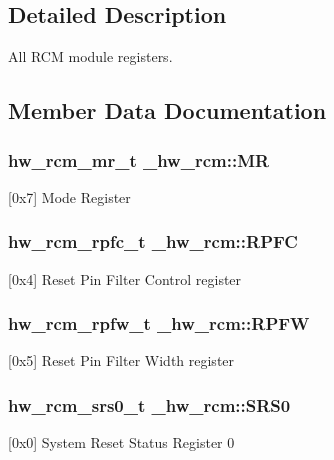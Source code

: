 \subsection{Detailed Description}
All R\+CM module registers. 

\subsection{Member Data Documentation}
\subsubsection[{\texorpdfstring{MR}{MR}}]{ {\bf hw\+\_\+rcm\+\_\+mr\+\_\+t} \+\_\+hw\+\_\+rcm\+::\+MR}\hypertarget{struct__hw__rcm_ab697d921c1115f1dbfc9c165e0b5de6f}{}\label{struct__hw__rcm_ab697d921c1115f1dbfc9c165e0b5de6f}
\mbox{[}0x7\mbox{]} Mode Register 
\subsubsection[{\texorpdfstring{R\+P\+FC}{RPFC}}]{ {\bf hw\+\_\+rcm\+\_\+rpfc\+\_\+t} \+\_\+hw\+\_\+rcm\+::\+R\+P\+FC}\hypertarget{struct__hw__rcm_a3c232f51a7a96dd5a78a09cd823f4495}{}\label{struct__hw__rcm_a3c232f51a7a96dd5a78a09cd823f4495}
\mbox{[}0x4\mbox{]} Reset Pin Filter Control register 
\subsubsection[{\texorpdfstring{R\+P\+FW}{RPFW}}]{ {\bf hw\+\_\+rcm\+\_\+rpfw\+\_\+t} \+\_\+hw\+\_\+rcm\+::\+R\+P\+FW}\hypertarget{struct__hw__rcm_a348d2ee757bbd9f7fd1dc5bed4bc3511}{}\label{struct__hw__rcm_a348d2ee757bbd9f7fd1dc5bed4bc3511}
\mbox{[}0x5\mbox{]} Reset Pin Filter Width register 
\subsubsection[{\texorpdfstring{S\+R\+S0}{SRS0}}]{ {\bf hw\+\_\+rcm\+\_\+srs0\+\_\+t} \+\_\+hw\+\_\+rcm\+::\+S\+R\+S0}\hypertarget{struct__hw__rcm_af7f3aec73d3aa5fdd275fd25af4a265e}{}\label{struct__hw__rcm_af7f3aec73d3aa5fdd275fd25af4a265e}
\mbox{[}0x0\mbox{]} System Reset Status Register 0 
